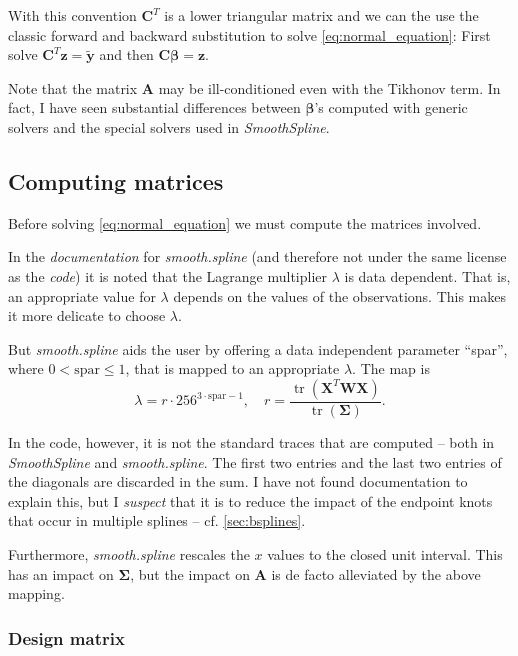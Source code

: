 \documentclass[a4paper]{scrartcl}
\newcommand{\vv}[1]{\ensuremath{\bm{#1}}}
\newcommand{\mat}[1]{\ensuremath{\bm{#1}}}
\newcommand{\T}[1]{\ensuremath{{#1}^{T}}}
\DeclareMathOperator\tr{tr}
\begin{document}
With this convention $\T{\mat C}$ is a lower triangular matrix and we can the use the classic forward and backward substitution to solve \cref{eq:normal_equation}:
First solve $\T{\mat C} \vv z = \widetilde{\vv y}$ and then $\mat C \vv \beta = \vv z$.

Note that the matrix $\mat A$ may be ill-conditioned even with the Tikhonov term.
In fact, I have seen substantial differences between $\vv\beta$'s computed with generic solvers and the special solvers used in \textit{SmoothSpline}.


\subsection{Computing matrices}

Before solving \cref{eq:normal_equation} we must compute the matrices involved.

In the \textit{documentation} for \textit{smooth.spline} (and therefore not under the same license as the \textit{code}) it is noted that the Lagrange multiplier $\lambda$ is data dependent.
That is, an appropriate value for $\lambda$ depends on the values of the observations.
This makes it more delicate to choose $\lambda$.

But \textit{smooth.spline} aids the user by offering a data independent parameter \enquote{spar}, where $0 < \text{spar} \leq 1$, that is mapped to an appropriate $\lambda$.
The map is
\begin{equation*}
    \lambda = r\cdot 256^{3\cdot\text{spar} - 1},
    \quad
    r = \frac{\tr(\T{\mat X} \mat W \mat X)}{\tr(\mat\Sigma)}.
\end{equation*}

In the code, however, it is not the standard traces that are computed -- both in \textit{SmoothSpline} and \textit{smooth.spline}.
The first two entries and the last two entries of the diagonals are discarded in the sum.
I have not found documentation to explain this, but I \emph{suspect} that it is to reduce the impact of the endpoint knots that occur in multiple splines -- cf. \cref{sec:bsplines}.

Furthermore, \textit{smooth.spline} rescales the $x$ values to the closed unit interval.
This has an impact on $\mat\Sigma$, but the impact on $\mat A$ is de facto alleviated by the above mapping.


\subsubsection{Design matrix}
\end{document}
